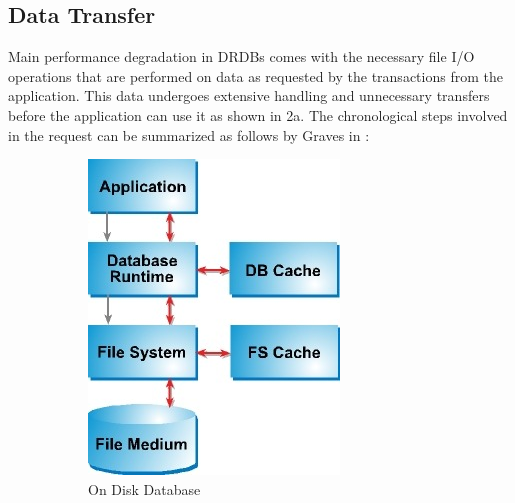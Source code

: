 \documentclass[10pt]{article} %
\begin{document}
\subsection{Data Transfer}
Main performance degradation in DRDBs comes with the necessary file I/O operations that are performed on data as requested by the transactions from the application. This data undergoes extensive handling and unnecessary transfers before the application can use it as shown in \figurename{2a}. The chronological steps involved in the request can be summarized as follows by Graves in \cite{graves2002memory}:

\begin{figure}
	\centering
	\begin{subfigure}[b]{0.3\textwidth}
		\centering
		\includegraphics[width=\textwidth]{./pictures/fig3}
		\caption{On Disk Database}
		\label{fig:fig3a}
	\end{subfigure}
	\qquad \qquad
	\begin{subfigure}[b]{0.3\textwidth}
		\centering

\end{subfigure}
\end{figure}
\end{document}
